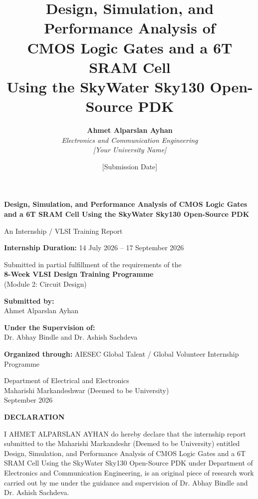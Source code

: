\documentclass[11pt,a4paper]{article}
\title{\textbf{Design, Simulation, and Performance Analysis of \\
CMOS Logic Gates and a 6T SRAM Cell \\
Using the SkyWater Sky130 Open-Source PDK}}
\author{
    \textbf{Ahmet Alparslan Ayhan} \\
    \textit{Electronics and Communication Engineering} \\
    \textit{[Your University Name]}
}
\date{[Submission Date]}
\begin{document}
\begin{titlepage}
\centering
\vspace*{1.5cm}
{\Huge \bfseries Design, Simulation, and Performance Analysis of CMOS Logic Gates and a 6T SRAM Cell Using the SkyWater Sky130 Open-Source PDK \par}
\vspace{1.5cm}
{\Large An Internship / VLSI Training Report \par}
\vspace{1cm}
{\large \textbf{Internship Duration:} 14 July 2026 -- 17 September 2026 \par}
\vspace{1cm}
{\large Submitted in partial fulfillment of the requirements of the \\
\textbf{8-Week VLSI Design Training Programme} \\
(Module 2: Circuit Design) \par}
\vspace{2cm}
{\large \textbf{Submitted by:} \\{} Ahmet Alparslan Ayhan \\{}  \par}
\vspace{1cm}
{\large \textbf{Under the Supervision of:} \\{} Dr. Abhay Bindle and Dr. Ashish Sachdeva \par}
\vspace{1cm}
{\large \textbf{Organized through:} AIESEC Global Talent / Global Volunteer Internship Programme \par}
\vspace{2cm}
{\large Department of Electrical and Electronics\\{} Maharishi Markandeshwar (Deemed to be University) \\{} September 2026  \par}
\vfill
\end{titlepage}

\newpage
\thispagestyle{empty}
\vspace*{1cm}
\begin{center}
{\Large \bfseries DECLARATION}
\end{center}
\vspace{0.5cm}
\noindent
I AHMET ALPARSLAN AYHAN do hereby declare that the internship report submitted to the Maharishi Markandeshr (Deemed to be University) entitled Design, Simulation, and Performance Analysis of CMOS Logic Gates and a 6T SRAM Cell Using the SkyWater Sky130 Open-Source PDK under Department of Electronics and Communication Engineering, is an original piece of research work carried out by me under the guidance and supervision of Dr. Abhay Bindle and Dr. Ashish Sachdeva.
\end{document}
